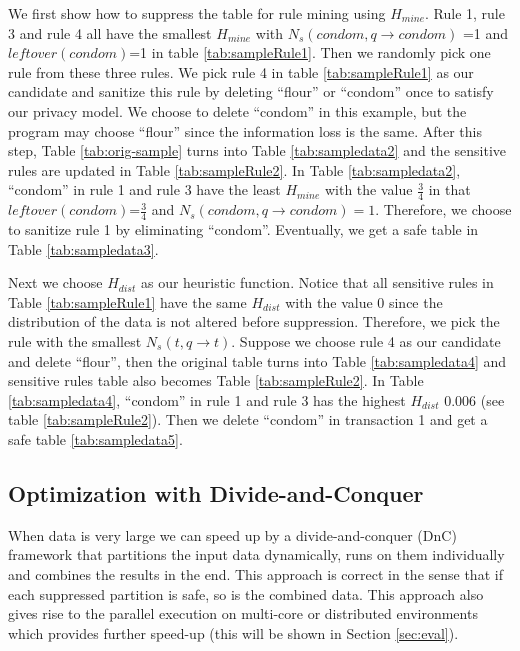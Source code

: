 {We first show how to suppress the table for rule mining using $H_{mine}$.
Rule 1, rule 3 and rule 4 all have the smallest $H_{mine}$ with $N_s(condom, q\rightarrow condom)$ =1 and $leftover(condom)$=1 in table \ref{tab:sampleRule1}. Then we randomly pick one rule from these three rules. We pick rule 4
in table \ref{tab:sampleRule1} as our candidate and
sanitize this rule by deleting ``flour'' or ``condom'' once to satisfy our privacy model. We choose to delete ``condom'' in this example, but the program may choose ``flour''
since the information loss is the same.
After this step, Table \ref{tab:orig-sample} turns into
Table \ref{tab:sampledata2} and the sensitive rules are updated in
Table \ref{tab:sampleRule2}. In Table \ref{tab:sampledata2},
``condom'' in rule 1 and rule 3 have the least $H_{mine}$ with
the value $\frac{3}{4}$ in that $leftover(condom)$=$\frac{3}{4}$ and
$N_s(condom, q\rightarrow condom)=1$. Therefore, we choose to
sanitize rule 1 by eliminating ``condom''.
Eventually, we get a safe table in Table \ref{tab:sampledata3}.

Next we choose $H_{dist}$ as our heuristic function.
Notice that all sensitive rules in Table  \ref{tab:sampleRule1}
have the same $H_{dist}$ with the value 0 since the
distribution of the data is not altered before suppression.
Therefore, we pick the rule with the smallest
 $N_s(t, q\rightarrow t)$. Suppose we choose rule 4 as our candidate and
delete ``flour'', then the original table turns into
Table \ref{tab:sampledata4} and sensitive rules
table also becomes Table \ref{tab:sampleRule2}.
In Table \ref{tab:sampledata4}, ``condom'' in rule 1 and rule 3 has
 the highest $H_{dist}$ 0.006 (see table \ref{tab:sampleRule2}). Then we delete ``condom'' in transaction 1 and get a safe table \ref{tab:sampledata5}.
}%

\subsection{Optimization with Divide-and-Conquer}
\label{algo:impmentation}

When data is very large we can speed up by
a divide-and-conquer (DnC) framework that 
partitions the input data dynamically, 
runs \PartialSuppressor
on them individually and combines the results in the end. This approach is
correct in the sense that if each suppressed partition is safe, so is the
combined data. This approach also gives rise to the parallel execution
on multi-core or distributed environments which provides further speed-up
(this will be shown in Section \ref{sec:eval}).

